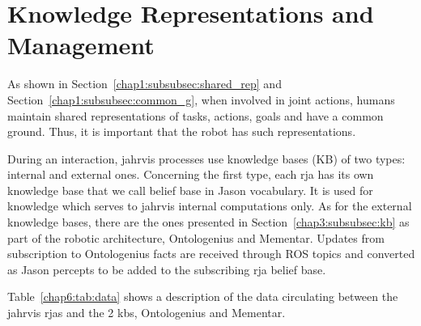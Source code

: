 \documentclass[a4paper,11pt,twoside]{StyleThese}
\begin{document}
\section{Knowledge Representations and Management}\label{chap6:sec:know}
As shown in Section~\ref{chap1:subsubsec:shared_rep} and Section~\ref{chap1:subsubsec:common_g}, when involved in joint actions, humans maintain shared representations of tasks, actions, goals and have a common ground. Thus, it is important that the robot has such representations.

During an interaction, \acrshort{jahrvis} processes use knowledge bases (KB) of two types: internal and external ones. Concerning the first type, each \acrshort{rja} has its own knowledge base that we call belief base in Jason vocabulary. It is used for knowledge which serves to \acrshort{jahrvis} internal computations only. As for the external knowledge bases, there are the ones presented in Section~\ref{chap3:subsubsec:kb} as part of the robotic architecture, Ontologenius and Mementar. Updates from subscription to Ontologenius facts are received through ROS topics and converted as Jason percepts to be added to the subscribing \acrshort{rja} belief base. 

Table~\ref{chap6:tab:data} shows a description of the data circulating between the \acrshort{jahrvis} \acrshort{rja}s and the 2 \acrlong{kb}s, Ontologenius and Mementar.
\end{document}
